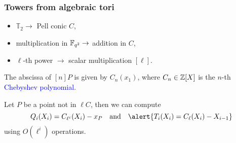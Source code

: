\documentclass[12pt]{beamer}
\begin{document}

\begin{frame}
	\frametitle{Towers from algebraic tori}

        \begin{itemize}
        \item $\mathbb{T}_2 \to$ Pell conic $C$,
        \item multiplication in $\mathbb{F}_{q^2} \to$ addition in $C$,
        \item $\ell$-th power $\to$ scalar multiplication $[\ell]$.
        \end{itemize}
	
	\begin{lemma}
          The abscissa of $[n]P$ is given by $C_n(x_1)$, where
          $C_n\in\mathbb{Z}[X]$ is the $n$-th \textcolor{blue}{Chebyshev
            polynomial}.
	\end{lemma}
	
	\begin{theorem}
          Let $P$ be a point not in $\ell C$, then we can compute
          \begin{equation*}
            Q_i(X_i) = C_{\ell^i}(X_i) - x_P
            \quad\text{and}\quad
            \alert{T_i(X_i) = C_{\ell}(X_i) - X_{i-1}}
          \end{equation*}
          using $O(\ell^i)$ operations.
        \end{theorem}
\end{frame}

\end{document}
